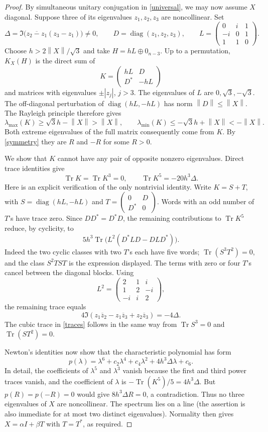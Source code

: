 \documentclass[11pt]{article}
\newcommand{\Tr}{\operatorname{Tr}}
\newcommand{\diag}{\operatorname{diag}}
\newcommand{\norm}[1]{\left\lVert#1\right\rVert}
\begin{document}
\begin{proof}
By simultaneous unitary conjugation in \eqref{universal}, we may now
assume $X$ diagonal. Suppose three of its eigenvalues $z_1,z_2,z_3$
are noncollinear. Set
\[
 \Delta=\Im\bigl(\overline{z_2-z_1}(z_3-z_1)\bigr)\ne0,\qquad
 D=\diag(z_1,z_2,z_3),\qquad
 L=\begin{pmatrix}0&i&1\\-i&0&1\\1&1&0\end{pmatrix}.
\]
Choose $h>2\norm{X}/\sqrt3$ and take $H=hL\oplus0_{n-3}$.
Up to a permutation, $K_X(H)$ is the direct sum of
\[
 K=\begin{pmatrix}hL&D\\D^*&-hL\end{pmatrix}
\]
and matrices with eigenvalues $\pm|z_j|$, $j>3$.
The eigenvalues of $L$ are $0,\sqrt3,-\sqrt3$.
The off-diagonal perturbation of $\diag(hL,-hL)$ has norm
$\norm D\leq\norm X$. The Rayleigh principle therefore gives
\[
 \lambda_{\max}(K)\geq\sqrt3h-\norm X>\norm X,\qquad
 \lambda_{\min}(K)\leq-\sqrt3h+\norm X<-\norm X.
\]
Both extreme eigenvalues of the full matrix consequently come from $K$.
By \eqref{symmetry} they are $R$ and $-R$ for some $R>0$.

We show that $K$ cannot have any pair of opposite nonzero eigenvalues.
Direct trace identities give
\begin{equation}\label{traces}
 \Tr K=\Tr K^3=0,\qquad \Tr K^5=-20h^3\Delta.
\end{equation}
Here is an explicit verification of the only nontrivial identity. Write
$K=S+T$, with $S=\diag(hL,-hL)$ and
$T=\left(\begin{smallmatrix}0&D\\D^*&0\end{smallmatrix}\right)$.
Words with an odd number of $T$'s have trace zero. Since $DD^*=D^*D$,
the remaining contributions to $\Tr K^5$ reduce, by cyclicity, to
\[
 5h^3\Tr\bigl(L^2(D^*LD-DLD^*)\bigr).
\]
Indeed the two cyclic classes with two $T$'s each have five words;
$\Tr(S^3T^2)=0$, and the class $S^2TST$ is the expression displayed.
The terms with zero or four $T$'s cancel between the diagonal blocks.
Using
\[
 L^2=\begin{pmatrix}2&1&i\\1&2&-i\\-i&i&2\end{pmatrix},
\]
the remaining trace equals
\[
 4\Im(z_1\overline z_2-z_1\overline z_3+z_2\overline z_3)
 =-4\Delta.
\]
The cubic trace in \eqref{traces} follows in the same way from
$\Tr S^3=0$ and $\Tr(ST^2)=0$.

Newton's identities now show that the characteristic polynomial has form
\[
 p(\lambda)=\lambda^6+c_2\lambda^4+c_4\lambda^2
               +4h^3\Delta\lambda+c_6.
\]
In detail, the coefficients of $\lambda^5$ and $\lambda^3$ vanish
because the first and third power traces vanish, and the coefficient of
$\lambda$ is $-\Tr(K^5)/5=4h^3\Delta$.
But $p(R)=p(-R)=0$ would give $8h^3\Delta R=0$, a contradiction.
Thus no three eigenvalues of $X$ are noncollinear. The spectrum lies
on a line (the assertion is also immediate for at most two distinct
eigenvalues). Normality then gives $X=\alpha I+\beta T$ with $T=T^*$,
as required.
\end{proof}
\end{document}
